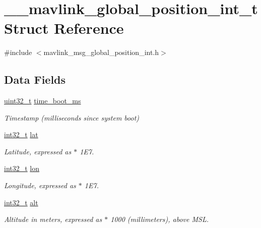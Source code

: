 \hypertarget{struct____mavlink__global__position__int__t}{\section{\-\_\-\-\_\-mavlink\-\_\-global\-\_\-position\-\_\-int\-\_\-t Struct Reference}
\label{struct____mavlink__global__position__int__t}
}


{\ttfamily \#include $<$mavlink\-\_\-msg\-\_\-global\-\_\-position\-\_\-int.\-h$>$}

\subsection*{Data Fields}
\begin{DoxyCompactItemize}
\item 
\hyperlink{stdint_8h_a435d1572bf3f880d55459d9805097f62}{uint32\-\_\-t} \hyperlink{struct____mavlink__global__position__int__t_a1b56c431f19cff6fadc2b0ac3b5959b6}{time\-\_\-boot\-\_\-ms}
\begin{DoxyCompactList}\small\item\em Timestamp (milliseconds since system boot) \end{DoxyCompactList}\item 
\hyperlink{group___n_a_m_e_gafd12020da5a235dfcf0c3c748fb5baed}{int32\-\_\-t} \hyperlink{struct____mavlink__global__position__int__t_a949653d08153161bb49b94794169a70f}{lat}
\begin{DoxyCompactList}\small\item\em Latitude, expressed as $\ast$ 1\-E7. \end{DoxyCompactList}\item 
\hyperlink{group___n_a_m_e_gafd12020da5a235dfcf0c3c748fb5baed}{int32\-\_\-t} \hyperlink{struct____mavlink__global__position__int__t_a2350bdf8af429bc2ed49b7cfac61cee7}{lon}
\begin{DoxyCompactList}\small\item\em Longitude, expressed as $\ast$ 1\-E7. \end{DoxyCompactList}\item 
\hyperlink{group___n_a_m_e_gafd12020da5a235dfcf0c3c748fb5baed}{int32\-\_\-t} \hyperlink{struct____mavlink__global__position__int__t_a1d9e69a26dc214bd624c9474ca3d79f4}{alt}
\begin{DoxyCompactList}\small\item\em Altitude in meters, expressed as $\ast$ 1000 (millimeters), above M\-S\-L. \end{DoxyCompactList}\item 

\end{DoxyCompactItemize}
